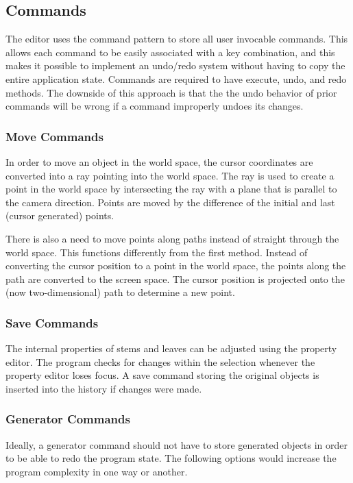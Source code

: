 \documentclass[10pt]{article}
\begin{document}
\subsection{Commands}
The editor uses the command pattern to store all user invocable commands. This allows each command to be easily associated with a key combination, and this makes it possible to implement an undo/redo system without having to copy the entire application state. Commands are required to have execute, undo, and redo methods. The downside of this approach is that the the undo behavior of prior commands will be wrong if a command improperly undoes its changes.

\subsubsection{Move Commands}
In order to move an object in the world space, the cursor coordinates are converted into a ray pointing into the world space. The ray is used to create a point in the world space by intersecting the ray with a plane that is parallel to the camera direction. Points are moved by the difference of the initial and last (cursor generated) points.

There is also a need to move points along paths instead of straight through the world space. This functions differently from the first method. Instead of converting the cursor position to a point in the world space, the points along the path are converted to the screen space. The cursor position is projected onto the (now two-dimensional) path to determine a new point.

\subsubsection{Save Commands}
The internal properties of stems and leaves can be adjusted using the property editor. The program checks for changes within the selection whenever the property editor loses focus. A save command storing the original objects is inserted into the history if changes were made.

\subsubsection{Generator Commands}
Ideally, a generator command should not have to store generated objects in order to be able to redo the program state. The following options would increase the program complexity in one way or another.
\end{document}
